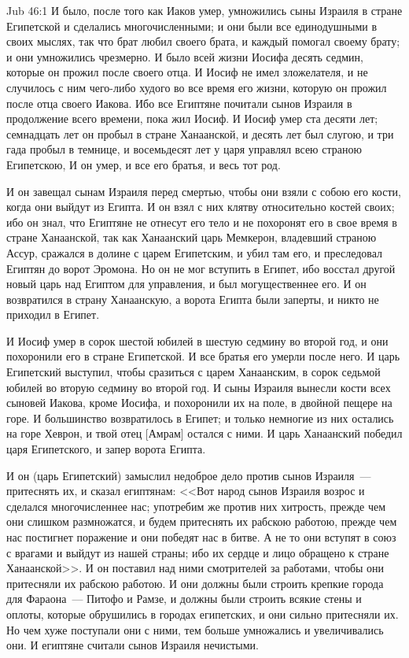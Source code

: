 \vs Jub 46:1
И было, после того как Иаков умер, умножились
сыны Израиля в стране Египетской и сделались
многочисленными; и они были все единодушными в
своих мыслях, так что брат любил своего брата, и
каждый помогал своему брату; и они умножились
чрезмерно. И было всей жизни Иосифа десять
седмин, которые он прожил после своего отца. И
Иосиф не имел зложелателя, и не случилось с ним
чего-либо худого во все время его жизни, которую
он прожил после отца своего Иакова. Ибо все
Египтяне почитали сынов Израиля в продолжение
всего времени, пока жил Иосиф. И Иосиф умер ста
десяти лет; семнадцать лет он пробыл в стране
Ханаанской, и десять лет был слугою, и три гада
пробыл в темнице, и восемьдесят лет у царя
управлял всею страною Египетскою, И он умер, и все
его братья, и весь тот род.

И он завещал сынам Израиля перед смертью, чтобы
они взяли с собою его кости, когда они выйдут из
Египта. И он взял с них клятву относительно
костей своих; ибо он знал, что Египтяне не отнесут
его тело и не похоронят его в свое время в
стране Ханаанской, так как Ханаанский царь
Мемкерон, владевший страною Ассур, сражался в
долине с царем Египетским, и убил там его, и
преследовал Египтян до ворот Эромона. Но он не
мог вступить в Египет, ибо восстал другой
новый царь над Египтом для управления, и был
могущественнее его. И он возвратился в страну
Ханаанскую, а ворота Египта были заперты, и никто
не приходил в Египет.

И Иосиф умер в сорок шестой юбилей в шестую
седмину во второй год, и они похоронили его в
стране Египетской. И все братья его умерли после
него. И царь Египетский выступил, чтобы сразиться
с царем Ханаанским, в сорок седьмой юбилей во
вторую седмину во второй год. И сыны Израиля
вынесли кости всех сыновей Иакова, кроме Иосифа,
и похоронили их на поле, в двойной пещере на горе.
И большинство возвратилось в Египет; и только
немногие из них остались на горе Хеврон, и твой
отец [Амрам] остался с ними. И царь Ханаанский
победил царя Египетского, и запер ворота Египта.

И он (царь Египетский) замыслил недоброе дело
против сынов Израиля~--- притеснять их, и сказал
египтянам: <<Вот народ сынов Израиля возрос и
сделался многочисленнее нас; употребим же против
них хитрость, прежде чем они слишком размножатся,
и будем притеснять их рабскою работою, прежде чем
нас постигнет поражение и они победят нас в
битве. А не то они вступят в союз с врагами и
выйдут из нашей страны; ибо их сердце и лицо
обращено к стране Ханаанской>>. И он поставил
над ними смотрителей за работами, чтобы они
притесняли их рабскою работою. И они должны были
строить крепкие города для Фараона~--- Питофо и
Рамзе, и должны были строить всякие стены и
оплоты, которые обрушились в городах египетских,
и они сильно притесняли их. Но чем хуже поступали
они с ними, тем больше умножались и увеличивались
они. И египтяне считали сынов Израиля нечистыми.

